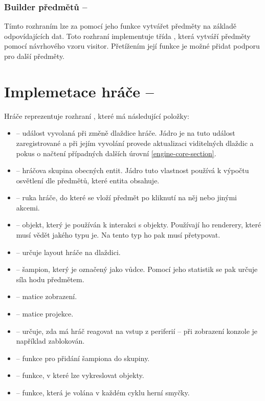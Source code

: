 \subsubsection{Builder předmětů -- }
Tímto rozhraním lze za pomocí jeho funkce  vytvářet předměty na základě odpovídajících dat. Toto rozhraní implementuje třída
, která vytváří předměty pomocí návrhového vzoru visitor. Přetížením její funkce  je možné přidat podporu
pro další předměty.


\section{Implemetace hráče -- }
Hráče reprezentuje rozhraní , které má následující položky:
\begin{itemize}
\item {} -- událost vyvolaná při změně dlaždice hráče. Jádro je na tuto událost zaregistrované a při jejím vyvolání provede aktualizaci
	viditelných dlaždic a pokus o načtení případných dalších úrovní \vref{engine-core-section}.
\item {} -- hráčova skupina obecných entit. Jádro tuto vlastnost používá k výpočtu osvětlení dle předmětů, které entita obsahuje.
\item {} -- ruka hráče, do které se vloží předmět po kliknutí na něj nebo jinými akcemi.
\item {} -- objekt, který je používán k interakci s objekty. Používají ho renderery, které  musí vědět jakého typu je. Na tento typ ho pak musí přetypovat.
\item {} -- určuje layout hráče na dlaždici.
\item {} -- šampion, který je označený jako vůdce. Pomocí jeho statistik se pak určuje síla hodu předmětem.
\item {} -- matice zobrazení.
\item {} -- matice projekce.
\item {} -- určuje, zda má hráč reagovat na vstup z periferií -- při zobrazení konzole je například zablokován.
\item {} -- funkce pro přidání šampiona do skupiny.
\item {} -- funkce, v které lze vykreslovat objekty.
\item {} -- funkce, která je volána v každém cyklu herní smyčky.
\end{itemize}


